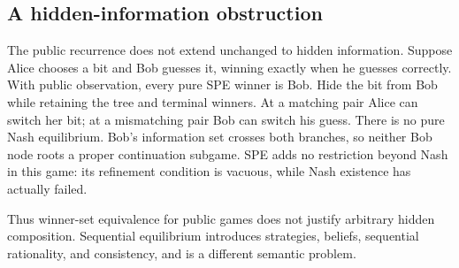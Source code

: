 \subsection{A hidden-information obstruction}

The public recurrence does not extend unchanged to hidden information.
Suppose Alice chooses a bit and Bob guesses it, winning exactly when
he guesses correctly. With public observation, every pure SPE winner
is Bob. Hide the bit from Bob while retaining the tree and terminal
winners. At a matching pair Alice can switch her bit; at a mismatching
pair Bob can switch his guess. There is no pure Nash equilibrium.
Bob's information set crosses both branches, so neither Bob node roots
a proper continuation subgame. SPE adds no restriction beyond Nash in
this game: its refinement condition is vacuous, while Nash existence
has actually failed.

Thus winner-set equivalence for public games does not justify arbitrary
hidden composition. Sequential equilibrium introduces strategies,
beliefs, sequential rationality, and consistency, and is a different
semantic problem. 
